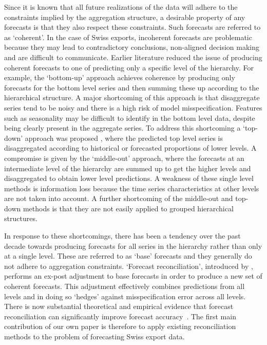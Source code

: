 \documentclass[a4paper,fleqn,11pt]{article}
\begin{document}
Since it is known that all future realizations of the data will adhere to the constraints implied by the aggregation structure, a desirable property of any forecasts is that they also respect these constraints. Such forecasts are referred to as `coherent'. In the case of Swiss exports, incoherent forecasts are problematic because they may lead to contradictory conclusions, non-aligned decision making and are difficult to communicate. Earlier literature reduced the issue of producing coherent forecasts to one of predicting only a specific level of the hierarchy. For example, the `bottom-up' approach \citep{Gross1990} achieves coherence by producing only forecasts for the bottom level series and then summing these up according to the hierarchical structure. A major shortcoming of this approach is that disaggregate series tend to be noisy and there is a high risk of model misspecification. Features such as seasonality may be difficult to identify in the bottom level data, despite being clearly present in the aggregate series. To address this shortcoming a `top-down' approach was proposed \citep[see][and references therein]{Athanasopoulos2009}, where the predicted top level series is disaggregated according to historical or forecasted proportions of lower levels. A compromise is given by the `middle-out' approach, where the forecasts at an intermediate level of the hierarchy are summed up to get the higher levels and disaggregated to obtain lower level predictions. A weakness of these single level methods is information loss because the time series characteristics at other levels are not taken into account. A further shortcoming of the middle-out and top-down methods is that they are not easily applied to grouped hierarchical structures.

In response to these shortcomings, there has been a tendency over the past decade towards producing forecasts for all series in the hierarchy rather than only at a single level. These are referred to as `base' forecasts and they generally do not adhere to aggregation constraints. `Forecast reconciliation', introduced by \cite{Hyndman2011}, performs an ex-post adjustment to base forecasts in order to produce a new set of coherent forecasts. This adjustment effectively combines predictions from all levels and in doing so `hedges' against misspecification error across all levels. There is now substantial theoretical and empirical evidence that forecast reconciliation can significantly improve forecast accuracy~\citep[see][and references therein]{Wickramasuriya2015}. The first main contribution of our own paper is therefore to apply existing reconciliation methods to the problem of forecasting Swiss export data.
\end{document}
